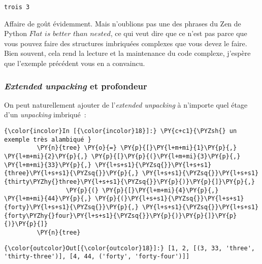     \begin{Verbatim}[commandchars=\\\{\},frame=single,framerule=0.3mm,rulecolor=\color{cellframecolor}]
trois 3
\end{Verbatim}

    Affaire de goût évidemment. Mais n'oublions pas une des phrases du Zen
de Python \(\textit{Flat is better than nested}\), ce qui veut dire que
ce n'est pas parce que vous pouvez faire des structures imbriquées
complexes que vous devez le faire. Bien souvent, cela rend la lecture et
la maintenance du code complexe, j'espère que l'exemple précédent vous
en a convaincu.

    \hypertarget{extended-unpacking-et-profondeur}{%
\subsubsection{\texorpdfstring{\emph{Extended unpacking} et
profondeur}{Extended unpacking et profondeur}}\label{extended-unpacking-et-profondeur}}

    On peut naturellement ajouter de l'\emph{extended unpacking} à n'importe
quel étage d'un \emph{unpacking} imbriqué~:

    \begin{Verbatim}[commandchars=\\\{\},frame=single,framerule=0.3mm,rulecolor=\color{cellframecolor}]
{\color{incolor}In [{\color{incolor}18}]:} \PY{c+c1}{\PYZsh{} un exemple très alambiqué }
         \PY{n}{tree} \PY{o}{=} \PY{p}{[}\PY{l+m+mi}{1}\PY{p}{,} \PY{l+m+mi}{2}\PY{p}{,} \PY{p}{[}\PY{p}{(}\PY{l+m+mi}{3}\PY{p}{,} \PY{l+m+mi}{33}\PY{p}{,} \PY{l+s+s1}{\PYZsq{}}\PY{l+s+s1}{three}\PY{l+s+s1}{\PYZsq{}}\PY{p}{,} \PY{l+s+s1}{\PYZsq{}}\PY{l+s+s1}{thirty\PYZhy{}three}\PY{l+s+s1}{\PYZsq{}}\PY{p}{)}\PY{p}{]}\PY{p}{,}
                 \PY{p}{(} \PY{p}{[}\PY{l+m+mi}{4}\PY{p}{,} \PY{l+m+mi}{44}\PY{p}{,} \PY{p}{(}\PY{l+s+s1}{\PYZsq{}}\PY{l+s+s1}{forty}\PY{l+s+s1}{\PYZsq{}}\PY{p}{,} \PY{l+s+s1}{\PYZsq{}}\PY{l+s+s1}{forty\PYZhy{}four}\PY{l+s+s1}{\PYZsq{}}\PY{p}{)}\PY{p}{]}\PY{p}{)}\PY{p}{]}
         \PY{n}{tree}
\end{Verbatim}


\begin{Verbatim}[commandchars=\\\{\},frame=single,framerule=0.3mm,rulecolor=\color{cellframecolor}]
{\color{outcolor}Out[{\color{outcolor}18}]:} [1, 2, [(3, 33, 'three', 'thirty-three')], [4, 44, ('forty', 'forty-four')]]
\end{Verbatim}
            
